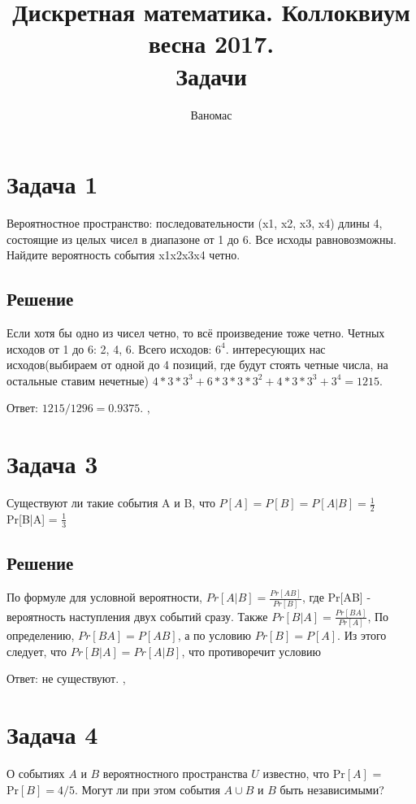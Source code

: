 \documentclass[a4paper,12pt]{article}
\renewcommand{\Pr} {\text {Pr}}
\begin{document}
	\title{Дискретная математика. Коллоквиум весна 2017. \\ Задачи}
	\author{Ваномас}
	\maketitle
\section*{Задача 1}
    
    Вероятностное пространство: последовательности (x1, x2, x3, x4) длины 4, состоящие из целых чисел в диапазоне от 1 до 6. Все исходы равновозможны. Найдите вероятность события x1x2x3x4 четно.
    
    \subsection*{Решение}
    
    Если хотя бы одно из чисел четно, то всё произведение тоже четно. Четных исходов от 1 до 6: 2, 4, 6. Всего исходов: $6^4$. интересующих нас исходов(выбираем от одной до 4 позиций, где будут стоять четные числа, на остальные ставим нечетные) $4 * 3 * 3^3 + 6 * 3 * 3 * 3^2 + 4 * 3 * 3^3 + 3^4 = 1215. $
    
    Ответ: $1215/1296 = 0.9375$.
    \sep
    \section*{Задача 3}
    
    Существуют ли такие события A и B, что $P[A] = P[B] = P[A|B] = \frac{1}{2}$
    Pr[B|A] = $\frac{1}{3}$
    
    \subsection*{Решение}
    
    По формуле для условной вероятности, $Pr[A|B] = \frac{Pr[AB]}{Pr[B]}$, где Pr[AB] - вероятность наступления двух событий сразу.
    Также $Pr[B|A] = \frac{Pr[BA]}{Pr[A]}$, По определению, $Pr[BA] = P[AB]$, а по условию $Pr[B] = P[A]$.
    Из этого следует, что $Pr[B|A] = Pr[A|B]$, что противоречит условию
    
    Ответ: не существуют.
    \sep
	\section*{Задача 4}
	О событиях $A$ и $B$ вероятностного пространства $U$ известно, что $\Pr [A]$ = $\Pr [B] = 4/5$. Могут ли при этом события $A\cup B$ и $B$ быть независимыми?
	
\end{document}
